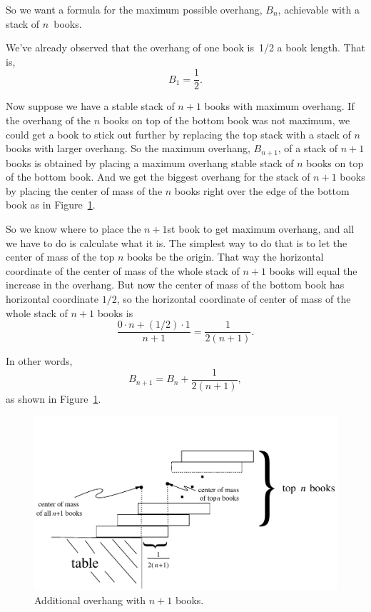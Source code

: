 So we want a formula for the maximum possible overhang, $B_n$, achievable
with a stack of $n$~books.

We've already observed that the overhang of one book is~1/2 a book
length.  That is,
\[
    B_1 = \frac{1}{2}.
\]

Now suppose we have a stable stack of $n+1$ books with maximum overhang.
If the overhang of the $n$ books on top of the bottom book was not
maximum, we could get a book to stick out further by replacing the top
stack with a stack of $n$ books with larger overhang.  So the maximum
overhang, $B_{n+1}$, of a stack of $n+1$ books is obtained by placing a
maximum overhang stable stack of $n$ books on top of the bottom book.  And
we get the biggest overhang for the stack of $n+1$ books by placing the
center of mass of the $n$ books right over the edge of the bottom book as
in Figure~\ref{Bn1}.

So we know where to place the $n+1$st book to get maximum overhang, and
all we have to do is calculate what it is.  The simplest way to do that is
to let the center of mass of the top $n$ books be the origin.  That way
the horizontal coordinate of the center of mass of the whole stack of
$n+1$ books will equal the increase in the overhang.  But now the
center of mass of the bottom book has horizontal coordinate $1/2$, so the
horizontal coordinate of center of mass of the whole stack of $n+1$ books is
\[
\frac{0 \cdot n + (1/2) \cdot 1}{n+1} = \frac{1}{2(n +1)}.
\]

In other words, 
\begin{equation}\label{eqBn}
    B_{n+1} = B_n + \frac{1}{2(n+1)},
\end{equation}
as shown in Figure~\ref{Bn1}.

\begin{figure}
\centerline{\includegraphics[width=.80\textwidth]{figures/bookstack-5}}
\caption{Additional overhang with $n+1$ books.}
\label{Bn1}
\end{figure}

